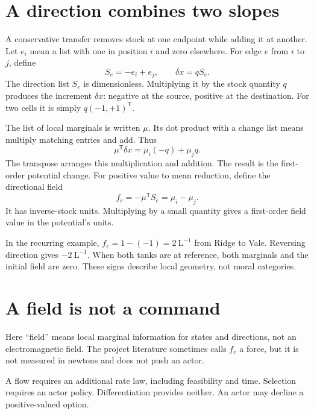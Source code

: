 \section{A direction combines two slopes}
A conservative transfer removes stock at one endpoint while adding it at another. Let $e_i$ mean a list with one in position $i$ and zero elsewhere. For edge $e$ from $i$ to $j$, define
\begin{equation}\label{eq:edge}
 S_e=-e_i+e_j,\qquad \delta x=qS_e.
\end{equation}
The direction list $S_e$ is dimensionless. Multiplying it by the stock quantity $q$ produces the increment $\delta x$: negative at the source, positive at the destination. For two cells it is simply $q(-1,+1)^{\mathsf T}$.

The list of local marginals is written $\mu$. Its dot product with a change list means multiply matching entries and add. Thus
\begin{equation*}
 \mu^{\mathsf T}\delta x=\mu_i(-q)+\mu_jq.
\end{equation*}
The transpose arranges this multiplication and addition. The result is the first-order potential change. For positive value to mean reduction, define the directional field
\begin{equation}\label{eq:field}
 f_e=-\mu^{\mathsf T}S_e=\mu_i-\mu_j.
\end{equation}
It has inverse-stock units. Multiplying by a small quantity gives a first-order field value in the potential's units.

In the recurring example, $f_e=1-(-1)=2\ \mathrm{L}^{-1}$ from Ridge to Vale. Reversing direction gives $-2\ \mathrm{L}^{-1}$. When both tanks are at reference, both marginals and the initial field are zero. These signs describe local geometry, not moral categories.

\section{A field is not a command}
Here ``field'' means local marginal information for states and directions, not an electromagnetic field. The project literature sometimes calls $f_e$ a force, but it is not measured in newtons and does not push an actor.

A flow requires an additional rate law, including feasibility and time. Selection requires an actor policy. Differentiation provides neither. An actor may decline a positive-valued option.


